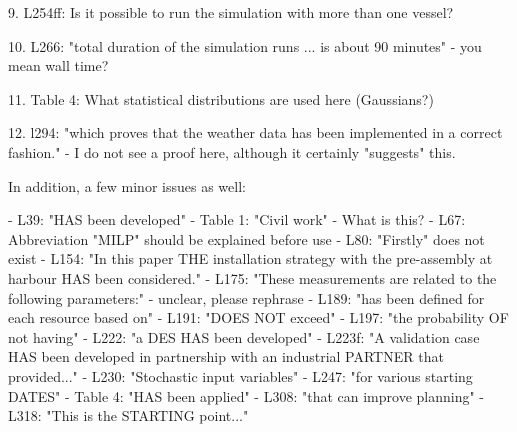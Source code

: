 9. L254ff: Is it possible to run the simulation with more than one vessel?

10. L266: "total duration of the simulation runs ... is about 90 minutes" - you mean wall time?

11. Table 4: What statistical distributions are used here (Gaussians?)

12. l294: "which proves that the weather data has been implemented in a correct fashion." - I do not see a proof here, although it certainly "suggests" this.


In addition, a few minor issues as well:

- L39: "HAS been developed"
- Table 1: "Civil work" - What is this?
- L67: Abbreviation "MILP" should be explained before use
- L80: "Firstly" does not exist
- L154: "In this paper THE installation strategy with the pre-assembly at harbour HAS been considered."
- L175: "These measurements are related to the following parameters:" - unclear, please rephrase
- L189: "has been defined for each resource based on"
- L191: "DOES NOT exceed"
- L197: "the probability OF not having"
- L222: "a DES HAS been developed"
- L223f: "A validation case HAS been developed in partnership with an industrial PARTNER that provided..."
- L230: "Stochastic input variables"
- L247: "for various starting DATES"
- Table 4: "HAS been applied"
- L308: "that can improve planning"
- L318: "This is the STARTING point..."
